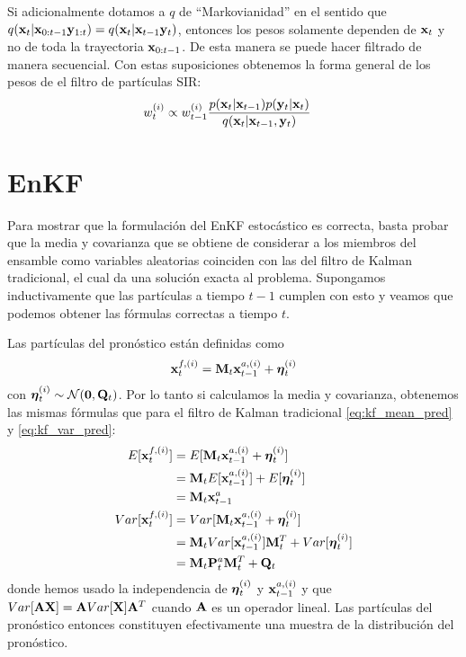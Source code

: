 Si adicionalmente dotamos a $q$ de ``Markovianidad'' en el sentido que $q(\mathbf{x}_t | \mathbf{x}_{0:t-1} \mathbf{y}_{1:t}) = q(\mathbf{x}_t | \mathbf{x}_{t-1} \mathbf{y}_t)$, entonces los pesos solamente dependen de $\mathbf{x}_t$ y no de toda la trayectoria $\mathbf{x}_{0:t-1}$. De esta manera se puede hacer filtrado de manera secuencial. Con estas suposiciones obtenemos la forma general de los pesos de el filtro de partículas SIR:
\begin{align*}
    w_t^{(i)} &\propto w_{t-1}^{(i)} \frac{p(\mathbf{x}_t | \mathbf{x}_{t-1}) p(\mathbf{y}_t | \mathbf{x}_t)}{q(\mathbf{x}_t | \mathbf{x}_{t-1}, \mathbf{y}_t)}
\end{align*}

\section{EnKF} \label{appendix:enkf}

Para mostrar que la formulación del EnKF estocástico es correcta, basta probar que la media y covarianza que se obtiene de considerar a los miembros del ensamble como variables aleatorias coinciden con las del filtro de Kalman tradicional, el cual da una solución exacta al problema. Supongamos inductivamente que las partículas a tiempo $t-1$ cumplen con esto y veamos que podemos obtener las fórmulas correctas a tiempo $t$.

Las partículas del pronóstico están definidas como 
$$ \mathbf{x}_t^{f, (i)} = \mathbf{M}_t \mathbf{x}_{t-1}^{a, (i)} + \mbox{\boldmath$ \eta $}_t^{(i)}$$
con $\mbox{\boldmath$ \eta $}_t^{(i)} \sim \mathcal{N}(\mathbf{0}, \mathbf{Q}_t)$. Por lo tanto si calculamos la media y covarianza, obtenemos las mismas fórmulas que para el filtro de Kalman tradicional \ref{eq:kf_mean_pred} y \ref{eq:kf_var_pred}:
\begin{align*}
    E[\mathbf{x}_t^{f, (i)}] &= E[\mathbf{M}_t \mathbf{x}_{t-1}^{a, (i)} + \mbox{\boldmath$ \eta $}_t^{(i)}] \\
    &= \mathbf{M}_t E[\mathbf{x}_{t-1}^{a, (i)}] + E[\mbox{\boldmath$ \eta $}_t^{(i)}] \\
    &= \mathbf{M}_t \mathbf{x}_{t-1}^a \\
    Var[\mathbf{x}_t^{f, (i)}] &= Var[\mathbf{M}_t \mathbf{x}_{t-1}^{a, (i)} + \mbox{\boldmath$ \eta $}_t^{(i)}] \\
    &= \mathbf{M}_t Var[\mathbf{x}_{t-1}^{a, (i)}] \mathbf{M}_t^T + Var[\mbox{\boldmath$ \eta $}_t^{(i)}] \\
    &= \mathbf{M}_t \mathbf{P}_t^a \mathbf{M}_t^T + \mathbf{Q}_t 
\end{align*}
donde hemos usado la independencia de $\mbox{\boldmath$ \eta $}_t^{(i)}$ y $\mathbf{x}_{t-1}^{a, (i)}$ y que $Var[\mathbf{A} \mathbf{X}] = \mathbf{A} Var[\mathbf{X}] \mathbf{A}^T$ cuando $\mathbf{A}$ es un operador lineal. Las partículas del pronóstico entonces constituyen efectivamente una muestra de la distribución del pronóstico.

